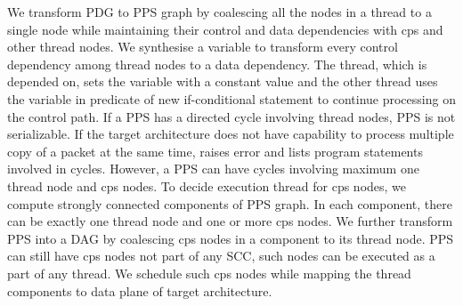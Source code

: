 \documentclass[letterpaper,twocolumn,10pt]{article}
\begin{document}
We transform PDG to PPS graph by coalescing all the nodes in a thread to a single node while maintaining their control and data dependencies with cps and other thread nodes.
We synthesise a variable to transform every control dependency among thread nodes to a data dependency.
The thread, which is depended on, sets the variable with a constant value and the other thread uses the variable in predicate of new if-conditional statement to continue processing on the control path.
If a PPS has a directed cycle involving thread nodes, PPS is not serializable.
If the target architecture does not have capability to process multiple copy of a packet at the same time,
\ucomp raises error and lists program statements involved in cycles.
However, a PPS can have cycles involving maximum one thread node and cps nodes.
To decide execution thread for cps nodes, we compute strongly connected components of PPS graph.
In each component, there can be exactly one thread node and one or more cps nodes.
We further transform PPS into a DAG by coalescing cps nodes in a component to its thread node.
PPS can still have cps nodes not part of any SCC, such nodes can be executed as a part of any thread.
We schedule such cps nodes while mapping the thread components to data plane of target architecture.


\end{document}
